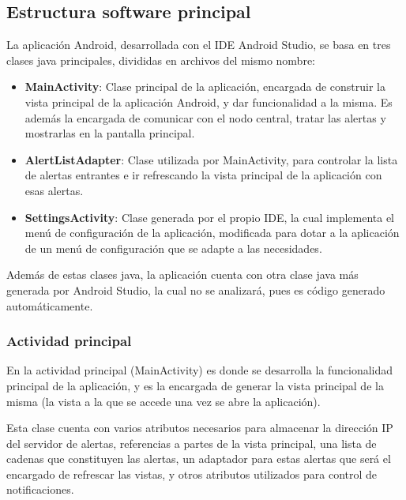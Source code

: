    \subsection{Estructura software principal}

    La aplicación Android, desarrollada con el IDE Android Studio, se basa en tres clases java principales, divididas en archivos del mismo nombre:

    \begin{itemize}
        \item \textbf{MainActivity}: Clase principal de la aplicación, encargada de construir la vista principal de la aplicación Android, y dar funcionalidad a la misma. Es además la encargada de comunicar con el nodo central, tratar las alertas y mostrarlas en la pantalla principal.
        \item \textbf{AlertListAdapter}: Clase utilizada por MainActivity, para controlar la lista de alertas entrantes e ir refrescando la vista principal de la aplicación con esas alertas.
        \item \textbf{SettingsActivity}: Clase generada por el propio IDE, la cual implementa el menú de configuración de la aplicación, modificada para dotar a la aplicación de un menú de configuración que se adapte a las necesidades.
    \end{itemize}

    Además de estas clases java, la aplicación cuenta con otra clase java más generada por Android Studio, la cual no se analizará, pues es código generado automáticamente.

        \subsubsection{Actividad principal}

        En la actividad principal (MainActivity) es donde se desarrolla la funcionalidad principal de la aplicación, y es la encargada de generar la vista principal de la misma (la vista a la que se accede una vez se abre la aplicación).

        \vspace{0.3cm}

        Esta clase cuenta con varios atributos necesarios para almacenar la dirección IP del servidor de alertas, referencias a partes de la vista principal, una lista de cadenas que constituyen las alertas, un adaptador para estas alertas que será el encargado de refrescar las vistas, y otros atributos utilizados para control de notificaciones. \\

